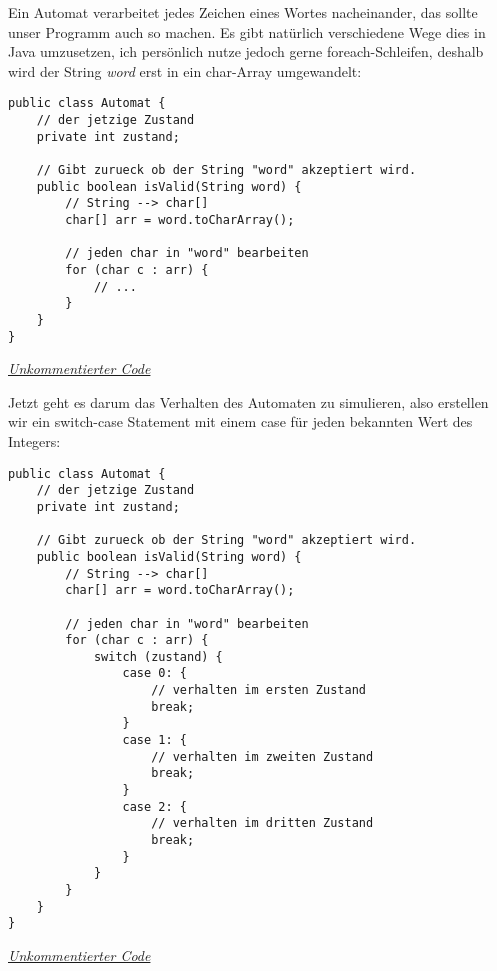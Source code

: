 \begin{flushleft}
Ein Automat verarbeitet jedes Zeichen eines Wortes nacheinander,
das sollte unser Programm auch so machen.
Es gibt natürlich verschiedene Wege dies in Java umzusetzen,
ich persönlich nutze jedoch gerne foreach-Schleifen,
deshalb wird der String \textit{word} erst in ein char-Array umgewandelt:
\end{flushleft}

\begin{center}
\begin{lstlisting}
public class Automat {
    // der jetzige Zustand
    private int zustand;

    // Gibt zurueck ob der String "word" akzeptiert wird.
    public boolean isValid(String word) {
        // String --> char[]
        char[] arr = word.toCharArray();

        // jeden char in "word" bearbeiten
        for (char c : arr) {
            // ...
        }
    }
}
\end{lstlisting}
\href{https://raw.githubusercontent.com/tim-tm/articles/refs/heads/main/informatik-notes/code/Automat.java}{\textit{Unkommentierter Code}} \\
\end{center}

\begin{flushleft}
Jetzt geht es darum das Verhalten des Automaten zu simulieren,
also erstellen wir ein switch-case Statement mit einem case für
jeden bekannten Wert des Integers:
\end{flushleft}

\begin{center}
\begin{lstlisting}
public class Automat {
    // der jetzige Zustand
    private int zustand;

    // Gibt zurueck ob der String "word" akzeptiert wird.
    public boolean isValid(String word) {
        // String --> char[]
        char[] arr = word.toCharArray();

        // jeden char in "word" bearbeiten
        for (char c : arr) {
            switch (zustand) {
                case 0: {
                    // verhalten im ersten Zustand
                    break;
                }
                case 1: {
                    // verhalten im zweiten Zustand
                    break;
                }
                case 2: {
                    // verhalten im dritten Zustand
                    break;
                }
            }
        }
    }
}
\end{lstlisting}
\href{https://raw.githubusercontent.com/tim-tm/articles/refs/heads/main/informatik-notes/code/Automat.java}{\textit{Unkommentierter Code}} \\
\end{center}

